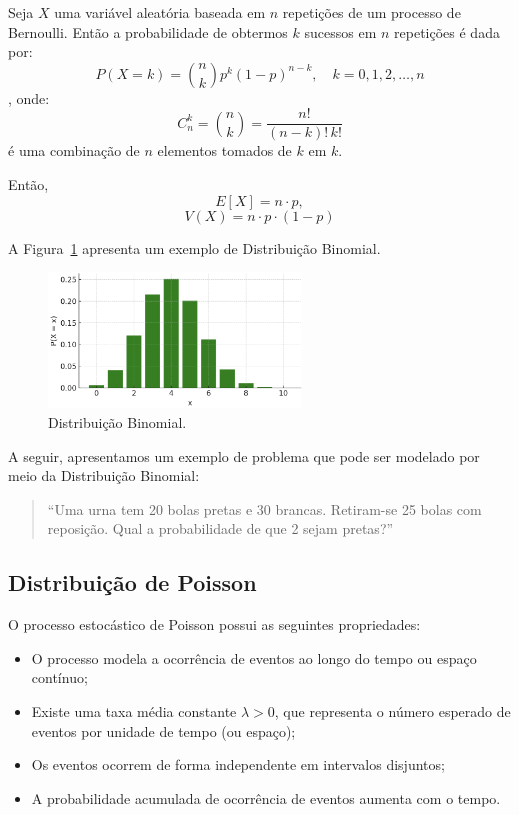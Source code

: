 \documentclass{article}
\begin{document}
Seja $X$ uma variável aleatória baseada em $n$ repetições de um processo de Bernoulli.  
Então a probabilidade de obtermos $k$ sucessos em $n$ repetições é dada por:
    $$
    P(X = k) = \binom{n}{k} p^k (1 - p)^{n - k}, \quad k = 0, 1, 2, \ldots, n
    $$,
onde:
    $$
    C_n^k = \binom{n}{k} = \frac{n!}{(n - k)! \, k!}
    $$
é uma combinação de $n$ elementos tomados de $k$ em $k$.

Então,
    $$
    E[X] = n \cdot p,
    $$
    $$
    V(X) = n \cdot p \cdot (1-p)
    $$

A Figura~\ref{fig:dist_disc_binomial} apresenta um exemplo de Distribuição Binomial.

\begin{figure}[H]
    \centering
    \includegraphics[width=0.6\textwidth]{figuras/dist_disc_binomial.png}
    \caption{Distribuição Binomial.}
    \label{fig:dist_disc_binomial}
\end{figure}

A seguir, apresentamos um exemplo de problema que pode ser modelado por meio da Distribuição Binomial:
\begin{quote}
``Uma urna tem 20 bolas pretas e 30 brancas. Retiram-se 25 bolas com reposição. Qual a probabilidade de que 2 sejam pretas?''
\end{quote}

\subsection{Distribuição de Poisson}
O processo estocástico de Poisson possui as seguintes propriedades:
\begin{itemize}
    \item O processo modela a ocorrência de eventos ao longo do tempo ou espaço contínuo;
    \item Existe uma taxa média constante $\lambda > 0$, que representa o número esperado de eventos por unidade de tempo (ou espaço);
    \item Os eventos ocorrem de forma independente em intervalos disjuntos;
    \item A probabilidade acumulada de ocorrência de eventos aumenta com o tempo.
\end{itemize}
\end{document}

